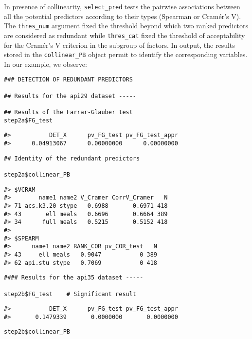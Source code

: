 In presence of collinearity, \texttt{select\_pred} tests the pairwise associations between all the potential predictors according to their types (Spearman or Cramér's V). The \texttt{thres\_num} argument fixed the threshold beyond which two ranked predictors are considered as redundant while \texttt{thres\_cat} fixed the threshold of acceptability for the Cramér's V criterion in the subgroup of factors. In output, the results stored in the \texttt{collinear\_PB} object permit to identify the corresponding variables. In our example, we observe:

\begin{verbatim}
### DETECTION OF REDUNDANT PREDICTORS

## Results for the api29 dataset -----

## Results of the Farrar-Glauber test 
step2a$FG_test       
\end{verbatim}

\begin{verbatim}
#>           DET_X      pv_FG_test pv_FG_test_appr 
#>      0.04913067      0.00000000      0.00000000
\end{verbatim}

\begin{verbatim}
## Identity of the redundant predictors

step2a$collinear_PB  
\end{verbatim}

\begin{verbatim}
#> $VCRAM
#>        name1 name2 V_Cramer CorrV_Cramer   N
#> 71 acs.k3.20 stype   0.6988       0.6971 418
#> 43       ell meals   0.6696       0.6664 389
#> 34      full meals   0.5215       0.5152 418
#> 
#> $SPEARM
#>      name1 name2 RANK_COR pv_COR_test   N
#> 43     ell meals   0.9047           0 389
#> 62 api.stu stype   0.7069           0 418
\end{verbatim}

\begin{verbatim}
#### Results for the api35 dataset -----

step2b$FG_test    # Significant result
\end{verbatim}

\begin{verbatim}
#>           DET_X      pv_FG_test pv_FG_test_appr 
#>       0.1479339       0.0000000       0.0000000
\end{verbatim}

\begin{verbatim}
step2b$collinear_PB
\end{verbatim}

